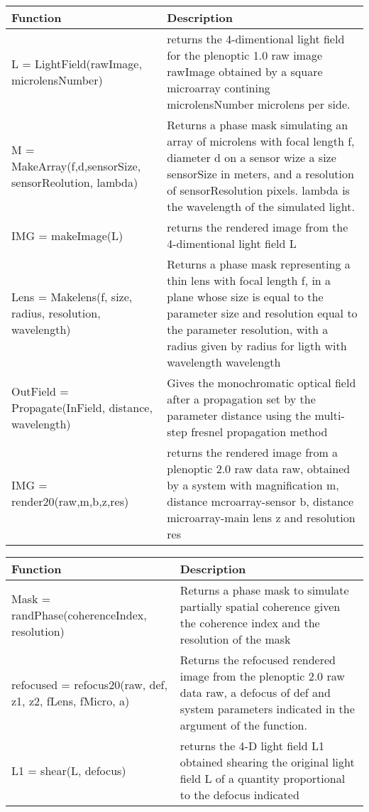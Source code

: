 \begin{center}
	\begin{tabular}{| p{8cm} | p{6cm} |}
		\hline
		Function & Description \\ \hline 
		    L = LightField(rawImage, microlensNumber) & returns the 4-dimentional light field for the plenoptic 1.0 raw image rawImage obtained by a square microarray contining microlensNumber microlens per side. \\ \hline
		    
		    M = MakeArray(f,d,sensorSize, sensorReolution, lambda) & Returns a phase mask simulating an array of microlens with focal length f, diameter d on a sensor wize a size sensorSize in meters, and a resolution of sensorResolution pixels. lambda is the wavelength of the simulated light. \\ \hline
		    
	IMG = makeImage(L) & returns the rendered image from the 4-dimentional light field L \\ \hline

	 Lens = Makelens(f, size, radius, resolution, wavelength) & Returns a phase mask representing a thin lens with focal length f, in a plane whose size is equal to the parameter size and resolution equal to the parameter resolution, with a radius given by radius for ligth with wavelength wavelength \\ \hline
	 
	 
	  OutField = Propagate(InField, distance, wavelength) & Gives the monochromatic optical field after a propagation set by the parameter distance using the multi-step fresnel propagation method \\ \hline 
	 
	 IMG = render20(raw,m,b,z,res) & returns the rendered image from a plenoptic 2.0 raw data raw, obtained by a system with magnification m, distance mcroarray-sensor b, distance microarray-main lens z and resolution res \\ \hline
	 
		
		
		\hline
	\end{tabular}
\end{center}
\newpage
\begin{center}
	\begin{tabular}{| p{8cm} | p{6cm} |}
		\hline
		Function & Description \\ \hline 
		Mask = randPhase(coherenceIndex, resolution) & Returns a phase mask to simulate partially spatial coherence given the coherence index and the resolution of the mask \\ \hline
		refocused = refocus20(raw, def, z1, z2, fLens, fMicro, a) & Returns the refocused rendered image from the plenoptic 2.0 raw data raw, a defocus of def and system parameters indicated in the argument of the function. \\ \hline
		L1 = shear(L, defocus) & returns the 4-D light field L1 obtained shearing the original light field L of a quantity proportional to the defocus indicated \\ \hline 
		
		
		\hline
	\end{tabular}
\end{center}
